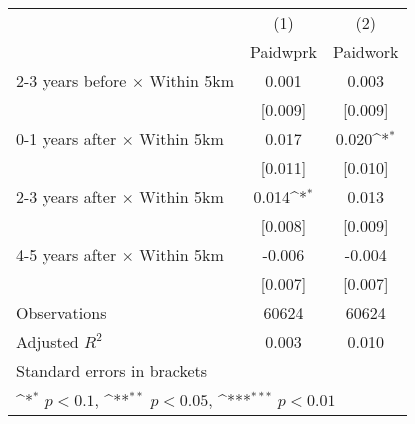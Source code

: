 {
\def\sym#1{\ifmmode^{#1}\else\(^{#1}\)\fi}
\begin{tabular}{l*{2}{c}}
\hline\hline
                    &\multicolumn{1}{c}{(1)}&\multicolumn{1}{c}{(2)}\\
                    &\multicolumn{1}{c}{Paidwprk}&\multicolumn{1}{c}{Paidwork}\\
\hline
2-3 years before $\times$ Within 5km&       0.001         &       0.003         \\
                    &     [0.009]         &     [0.009]         \\
0-1 years after $\times$ Within 5km&       0.017         &       0.020\sym{*}  \\
                    &     [0.011]         &     [0.010]         \\
2-3 years after $\times$ Within 5km&       0.014\sym{*}  &       0.013         \\
                    &     [0.008]         &     [0.009]         \\
4-5 years after $\times$ Within 5km&      -0.006         &      -0.004         \\
                    &     [0.007]         &     [0.007]         \\
\hline
Observations        &       60624         &       60624         \\
Adjusted \(R^{2}\)  &       0.003         &       0.010         \\
\hline\hline
\multicolumn{3}{l}{\footnotesize Standard errors in brackets}\\
\multicolumn{3}{l}{\footnotesize \sym{*} \(p<0.1\), \sym{**} \(p<0.05\), \sym{***} \(p<0.01\)}\\
\end{tabular}
}

